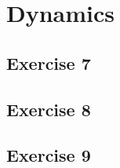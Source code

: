 \section{Dynamics}
\subsection{Exercise 7}
\lipsum[13]

\begin{solution}
    \lipsum[14]
\end{solution}

\subsection{Exercise 8}
\lipsum[15]

\begin{solution}
    \lipsum[16]
\end{solution}

\subsection{Exercise 9}
\lipsum[17]

\begin{solution}
    \lipsum[18]
\end{solution}

